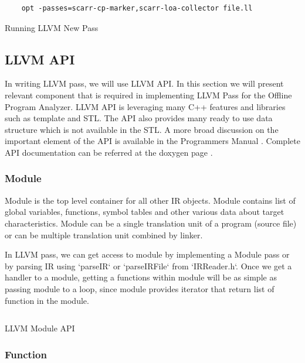 \begin{listing}
\begin{verbatim}
    opt -passes=scarr-cp-marker,scarr-loa-collector file.ll 
\end{verbatim}
\caption{Running LLVM New Pass}    
\label{listing:2-4}
\end{listing}

\subsection{LLVM API}

In writing LLVM pass, we will use LLVM API. In this section we will present relevant component that is required in implementing LLVM Pass for the Offline Program Analyzer. LLVM API is leveraging many C++ features and libraries such as template and STL. The API also provides many ready to use data structure which is not available in the STL. A more broad discussion on the important element of the API is available in the Programmers Manual \cite{LLVMProgrammerManuala}. Complete API documentation can be referred at the doxygen page \cite{LLVMLLVMa}.

\subsubsection{Module}

Module is the top level container for all other IR objects. Module contains list of global variables, functions, symbol tables and other various data about target characteristics. Module can be a single translation unit of a program (source file) or can be multiple translation unit combined by linker. 

In LLVM pass, we can get access to module by implementing a Module pass or by parsing IR using `parseIR` or `parseIRFile` from `IRReader.h`. Once we get a handler to a module, getting a functions within module will be as simple as passing module to a loop, since module provides iterator that return list of function in the module.

\begin{listing}
\inputminted[]{cpp}{code/module.cpp}
\caption{LLVM Module API}    
\label{listing:2-5}
\end{listing}

\subsubsection{Function}

